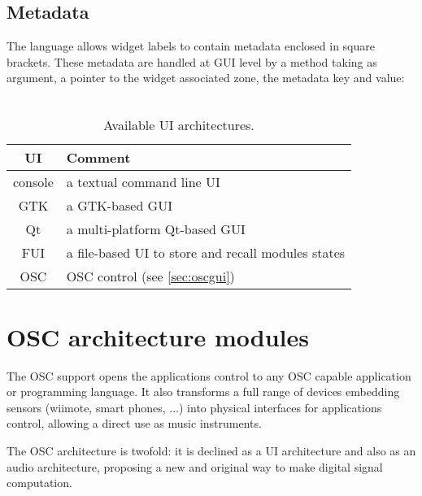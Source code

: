 \subsection{Metadata}
\label{sec:metadata}
The \faust language allows widget labels to contain metadata enclosed in square brackets. These metadata are handled at GUI level by a  method taking as argument, a pointer to the widget associated zone, the metadata key and value: \\
\htab{} \\


\begin{table}[htdp]
\begin{center}
\begin{tabular}{|c|l|}
\hline
\bf{UI} & \bf{Comment} \\
\hline
console  & a textual command line UI \\
GTK  & a GTK-based GUI \\
Qt   & a multi-platform Qt-based GUI \\
FUI  & a file-based UI to store and recall modules states \\
OSC  & OSC control (see \ref{sec:oscgui}) \\
\hline
\end{tabular}
\end{center}
\caption{Available UI architectures.}
\label{tab:uiarch}
\end{table}%


\section{OSC architecture modules} \label{sec:osc}

The OSC \cite{OSC} support opens the \faust applications control to any OSC capable application or programming language.
It also transforms a full range of devices embedding sensors (wiimote, smart phones, ...) into physical interfaces for \faust applications control, allowing a direct use as music instruments.

The \faust OSC architecture is twofold: it is declined as a UI architecture and also as an audio architecture, proposing a new and original way to make digital signal computation.

